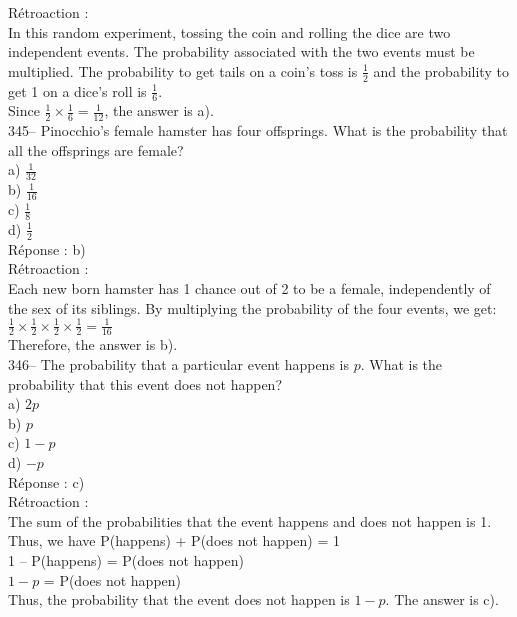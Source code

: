 \documentclass[letterpaper, 12pt]{article}
\begin{document}
R\'etroaction : \\
In this random experiment, tossing the coin and rolling the dice are two independent events. The probability associated with the two events must be multiplied.
The probability to get tails on a coin's toss is $\frac{1}{2}$ and the probability to get 1 on a dice's roll is $\frac{1}{6}$.\\[2mm]
Since $\frac{1}{2}\times \frac{1}{6}=\frac{1}{12}$, the answer is a).\\

345-- Pinocchio's female hamster has four offsprings. What is the probability that all the offsprings are female?\\

a) $\frac{1}{32}$\\[2mm]
b) $\frac{1}{16}$\\[2mm]
c) $\frac{1}{8}$\\[2mm]
d) $\frac{1}{2}$\\

R\'eponse : b)\\

R\'etroaction : \\
Each new born hamster has 1 chance out of 2 to be a female, independently of the sex of its siblings. By multiplying the probability of the four events, we get:\\[2mm]
$\frac{1}{2}\times\frac{1}{2}\times\frac{1}{2}\times\frac{1}{2}=\frac{1}{16}$\\[2mm]
Therefore, the answer is b).\\

346-- The probability that a particular event happens is $p$. What is the probability that this event does not happen?\\

a) $2p$\\
b) $p$\\
c) $1-p$\\
d) $-p$\\

R\'eponse : c)\\

R\'etroaction : \\
The sum of the probabilities that the event happens and does not happen is 1.\\
Thus, we have P(happens) + P(does not happen) = 1\\
1 -- P(happens) = P(does not happen) \\
$1 - p$ = P(does not happen)\\
Thus, the probability that the event does not happen is $1-p$. The answer is c).\\
\end{document}
